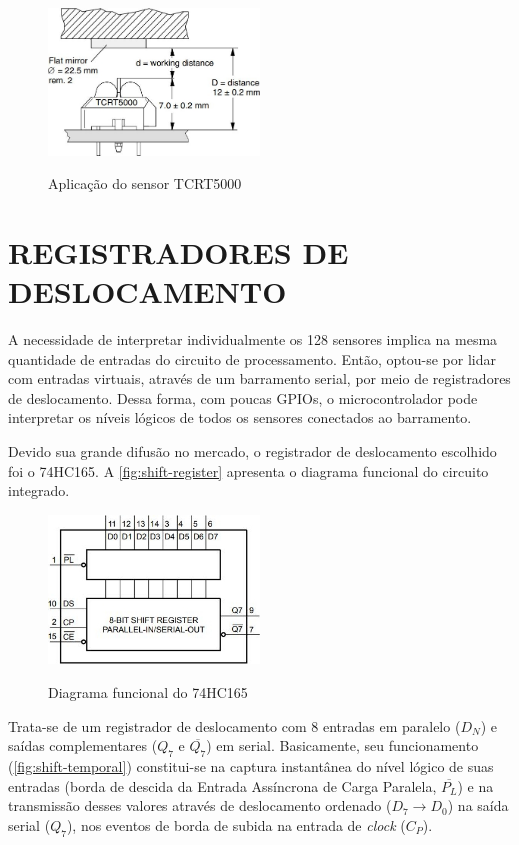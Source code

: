 \begin{figure}[H]
    \centering
    \caption{Aplicação do sensor TCRT5000}
    \includegraphics[width=0.5\textwidth]{./dados/figuras/sensor-op}
    \label{fig:sensoraplicacao}
\end{figure}

\section{REGISTRADORES DE DESLOCAMENTO}
\label{sec:registradores}

A necessidade de interpretar individualmente os 128 sensores implica na mesma quantidade de entradas do circuito de processamento. Então, optou-se por lidar com entradas virtuais, através de um barramento serial, por meio de registradores de deslocamento. Dessa forma, com poucas GPIOs, o microcontrolador pode interpretar os níveis lógicos de todos os sensores conectados ao barramento.

Devido sua grande difusão no mercado, o registrador de deslocamento escolhido foi o 74HC165. A \autoref{fig:shift-register} apresenta o diagrama funcional do circuito integrado.

\begin{figure}[H]
    \centering
    \caption{Diagrama funcional do 74HC165}
    \includegraphics[width=0.5\textwidth]{./dados/figuras/shift-register}
    \label{fig:shift-register}
\end{figure}

Trata-se de um registrador de deslocamento com 8 entradas em paralelo ($D_{N}$) e saídas complementares ($Q_{7}$ e $\overline{Q_{7}}$) em serial. Basicamente, seu funcionamento (\autoref{fig:shift-temporal}) constitui-se na captura instantânea do nível lógico de suas entradas (borda de descida da Entrada Assíncrona de Carga Paralela, $\overline{P_{L}}$) e na transmissão desses valores através de deslocamento ordenado ($D_{7} \rightarrow D_{0}$) na saída serial ($Q_{7}$), nos eventos de borda de subida na entrada de \emph{clock} ($C_{P}$).

